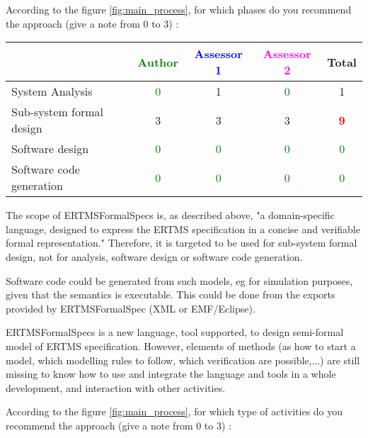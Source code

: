 According to the figure \ref{fig:main_process}, for which phases do you recommend the approach (give a note from 0 to  3) :

\begin{tabular}{|l | c | c | c | c|}
\hline
& \textcolor{green}{Author} & \textcolor{blue}{Assessor 1} & \textcolor{magenta}{Assessor 2} & Total \\
\hline 
System Analysis & \textcolor{green}{0} & 1     & \textcolor{green}{0} & 1     \\
\hline
Sub-system formal design & 3     & 3     & 3     & \textcolor{red}{\textbf{9}} \\
\hline
Software design & \textcolor{green}{0} & \textcolor{green}{0} & \textcolor{green}{0} & \textcolor{green}{0} \\
\hline
Software code generation & \textcolor{green}{0} & \textcolor{green}{0} & \textcolor{green}{0} & \textcolor{green}{0} \\
\hline
\end{tabular}

\begin{author_comment}
The scope of ERTMSFormalSpecs is, as described above, "a domain-specific language, designed to express the ERTMS specification in a concise and verifiable formal representation."
Therefore, it is targeted to be used for sub-system formal design, not for analysis, software design or software code generation.
\end{author_comment}

\begin{assessor1}
Software code could be generated from such models, eg for simulation purposes, given that the semantics is executable. This could be done from the exports provided by ERTMSFormalSpec (XML or EMF/Eclipse). 
\end{assessor1}

\begin{assessor2}
ERTMSFormalSpecs is a new language, tool supported, to design semi-formal model of ERTMS specification. However, elements of methods (as how to start a model, which modelling rules to follow, which verification are possible,...) are still missing to know how to use and integrate the language and tools in a whole development, and interaction with other activities.
\end{assessor2}

According to the figure \ref{fig:main_process}, for which type of activities do you recommend the approach (give a note from 0 to  3) :

